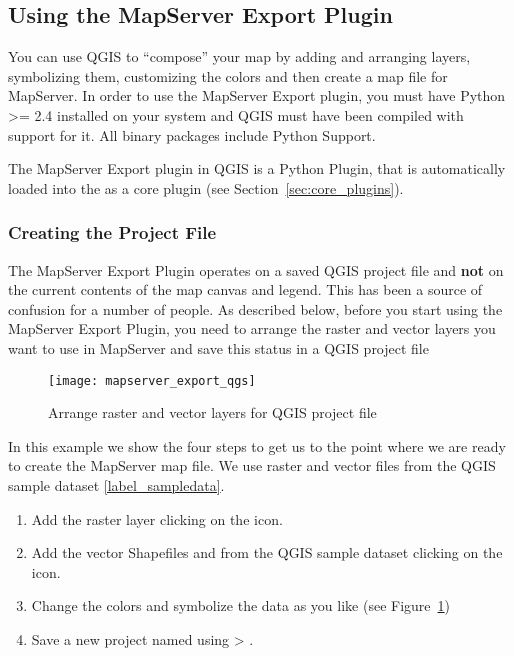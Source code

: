 \subsection{Using the MapServer Export Plugin}\label{sec:mapserver_export}


You can use QGIS to ``compose'' your map by adding and arranging layers, 
symbolizing them, customizing the colors and then create a map file 
for MapServer. In order to use the MapServer Export plugin, you 
must have Python >= 2.4 installed on your system and QGIS must have been 
compiled with support for it. All binary packages include Python Support.

The MapServer Export plugin in QGIS \CURRENT is a Python Plugin, that is 
automatically loaded into the  as a core plugin 
(see Section~\ref{sec:core_plugins}).

\subsubsection{Creating the Project File}

The MapServer Export Plugin operates on a saved QGIS project file and 
\textbf{not} on the current contents of the map canvas and legend. This 
has been a source of confusion for a number of people. As described below, 
before you start using the MapServer Export Plugin, you need to arrange 
the raster and vector layers you want to use in MapServer and save this 
status in a QGIS project file

\begin{figure}[ht]
\begin{center}
  \caption{Arrange raster and vector layers for QGIS project file \nixcaption}
  \label{fig:mapserver_export_qgs}\smallskip
  \texttt{[image: mapserver\_export\_qgs]}
\end{center}
\end{figure}

In this example we show the four steps to get us to the point where we are 
ready to create the MapServer map file. We use raster and vector files from 
the QGIS sample dataset \ref{label_sampledata}.

\begin{enumerate}
\item Add the raster layer  clicking on the 
 icon.
\item Add the vector Shapefiles  and 
 from the QGIS sample dataset clicking on the 
 icon.
\item Change the colors and symbolize the data as you like (see 
Figure~\ref{fig:mapserver_export_qgs})
\item Save a new project named  using 
 > .
\end{enumerate} 

